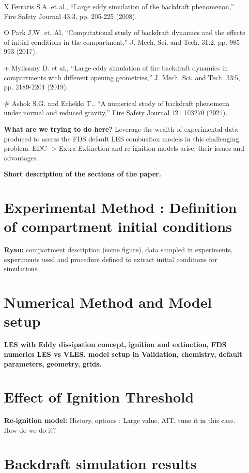 \documentclass[12pt,letterpaper]{article}
\begin{document}
\begin{flushleft}
X Ferraris S.A. et al., “Large eddy simulation of the backdraft phenomenon,” Fire Safety Journal 43:3, pp. 205-225 (2008).

O Park J.W. et. Al, “Computational study of backdraft dynamics and the effects of initial conditions in the compartment,” J. Mech. Sci. and Tech. 31:2, pp. 985-993 (2017).

+ Myilsamy D. et al., “Large eddy simulation of the backdraft dynamics in compartments with different opening geometries,” J. Mech. Sci. and Tech. 33:5, pp. 2189-2201 (2019).

# Ashok S.G. and Echekki T., “A numerical study of backdraft phenomena under normal and reduced gravity,” Fire Safety Journal 121 103270 (2021).


\textbf{What are we trying to do here?} Leverage the wealth of experimental data produced to assess the FDS default LES combusiton models in this challenging problem.  EDC -> Extra Extinction and re-ignition models arise, their issues and advantages. 

\textbf{Short description of the sections of the paper.}

\section{Experimental Method : Definition of compartment initial conditions}

\textbf{Ryan:} compartment description (some figure), data sampled in experiments, experiments used and procedure defined to extract initial conditions for simulations.

\section{Numerical Method and Model setup}

\textbf{LES with Eddy dissipation concept, ignition and extinction, FDS numerics  LES vs VLES, model setup in Validation, chemistry, default parameters, geometry, grids.}

\section{Effect of Ignition Threshold}

\textbf{Re-ignition model:} History, options : Large value, AIT, tune it in this case. How do we do it?

\section{Backdraft simulation results}


\end{flushleft}
\end{document}
